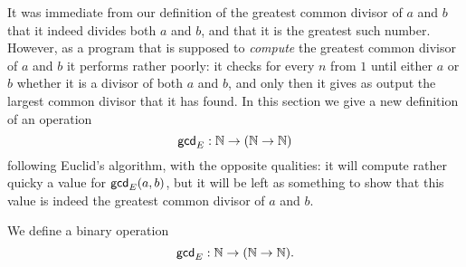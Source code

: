 It was immediate from our definition of the greatest common divisor of $a$ and $b$ that it indeed divides both $a$ and $b$, and that it is the greatest such number. However, as a program that is supposed to \emph{compute} the greatest common divisor of $a$ and $b$ it performs rather poorly: it checks for every $n$ from $1$ until either $a$ or $b$ whether it is a divisor of both $a$ and $b$, and only then it gives as output the largest common divisor that it has found. In this section we give a new definition of an operation
\begin{equation*}
  \mathsf{gcd}_E:{\mathbb{N}} \to ({\mathbb{N}} \to {\mathbb{N}})
\end{equation*}
following Euclid's algorithm, with the opposite qualities: it will compute rather quicky a value for $\mathsf{gcd}_E(a,b)$, but it will be left as something to show that this value is indeed the greatest common divisor of $a$ and $b$.

\begin{defn}
  We define a binary operation
  \begin{equation*}
    \mathsf{gcd}_E:{\mathbb{N}} \to ({\mathbb{N}}\to{\mathbb{N}}).
  \end{equation*}
\end{defn}

